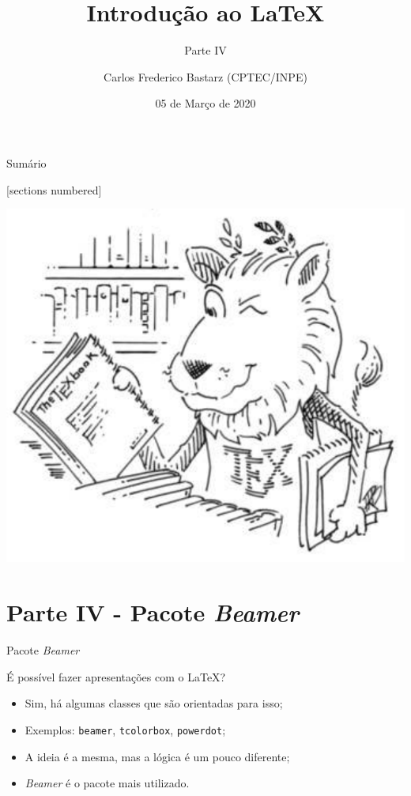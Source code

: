 \documentclass[10pt]{beamer}
\title{Introdução ao \LaTeX}
\subtitle{Parte IV}
\date{05 de Março de 2020}
\author{Carlos Frederico Bastarz (CPTEC/INPE)}
\institute{Instituto Nacional de Pesquisas Espaciais (INPE)}
\begin{document}
\maketitle

\begin{frame}[c]{Sumário}
    \vspace{2em}
    \begin{multicols}{2}
        \begin{minipage}{0.49\textwidth}
           \vspace{8mm}
           [sections numbered]
           \tableofcontents
        \end{minipage}
        \begin{minipage}{0.49\textwidth}
            \includegraphics[width=\textwidth]{./figs/ctan_lion_350x350.pdf}
        \end{minipage}
    \end{multicols}
\end{frame}

\section{Parte IV - Pacote \textit{Beamer}}

\begin{frame}{Pacote \textit{Beamer}}
	\begin{block}{É possível fazer apresentações com o \LaTeX{}?}
		\begin{itemize}
			\pause
			\item Sim, há algumas classes que são orientadas para isso;
			\pause
			\item Exemplos: {\tt beamer}, {\tt tcolorbox}, {\tt powerdot};
			\pause
			\item A ideia é a mesma, mas a lógica é um pouco diferente;
			\pause
			\item \textit{Beamer} é o pacote mais utilizado.
		\end{itemize}
	\end{block}
\end{frame}
\end{document}
